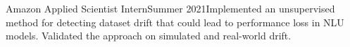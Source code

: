   {Amazon Applied Scientist Intern}{Summer 2021}{Implemented an unsupervised method for detecting dataset drift that could lead to performance loss in NLU models. Validated the approach on simulated and real-world drift.}{}